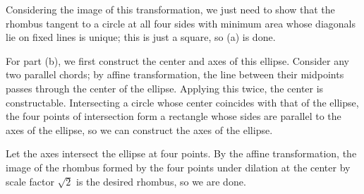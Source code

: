 Considering the image of this transformation, we just need to show that the rhombus tangent to a circle at all four sides with minimum area whose diagonals lie on fixed lines is unique; this is just a square, so (a) is done.

For part (b), we first construct the center and axes of this ellipse. Consider any two parallel chords; by affine transformation, the line between their midpoints passes through the center of the ellipse. Applying this twice, the center is constructable. Intersecting a circle whose center coincides with that of the ellipse, the four points of intersection form a rectangle whose sides are parallel to the axes of the ellipse, so we can construct the axes of the ellipse.

Let the axes intersect the ellipse at four points. By the affine transformation, the image of the rhombus formed by the four points under dilation at the center by scale factor $\sqrt2$ is the desired rhombus, so we are done.

